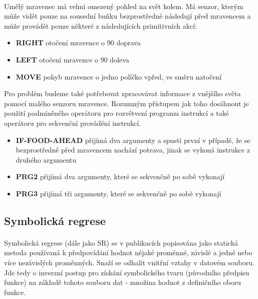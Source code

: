 \documentclass[bc,male,java,dept460]{diploma}		%
\begin{document}

\paragraph*{}
Umělý mravenec má velmi omezený pohled na svět kolem. Má senzor, kterým může vidět pouze na sousední buňku bezprostředně následují před mravencem a může provádět pouze některé z následujících primitivních akcí:

\begin{itemize}
\item \textbf{RIGHT} otočení mravence o 90 doprava
\item \textbf{LEFT} otočení mravence o 90 doleva
\item \textbf{MOVE} pohyb mravence o jedno políčko vpřed, ve směru natočení
\end{itemize}

Pro problém budeme také potřebovat zpracovávat informace z vnějšího světa pomocí malého senzoru mravence. Rozumným přístupem jak toho dosáhnout je použití podmíněného operátoru pro rozvětvení programu instrukcí a také operátoru pro sekvenční provádění instrukcí.

\begin{itemize}
\item \textbf{IF-FOOD-AHEAD} přijímá dva argumenty a spustí první v případě, že se bezprostředně před mravencem nachází potrava, jinak se vykoná instrukce z druhého argumentu
\item \textbf{PRG2} přijímá dva argumenty, které se sekvenčně po sobě vykonají
\item \textbf{PRG3} přijímá tři argumenty, které se sekvenčně po sobě vykonají
\end{itemize}

\subsection{Symbolická regrese}
\paragraph*{}
Symbolická regrese (dále jako SR) se v publikacích popisována jako statická metoda používaná k předpovídání hodnot nějaké proměnné, závislé a jedné nebo více nezávislých proměnných. Snaží se odhalit vnitřní vztahy v datovém souboru. Jde tedy o inverzní postup pro získání symbolického tvaru (původního předpisu funkce) na základě tohoto souboru dat - množina hodnot z definičního oboru funkce. 
\end{document}
